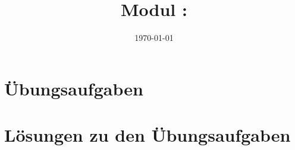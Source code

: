 \documentclass[twoside, a4paper]{article}
\title{Modul \GetItDigitalModulnumber: \GetItDigitalModulname}
\author{}
\institute{GET it digital}
\date{\today}
\begin{document}

{\setlength{\parskip}{0.05ex}    %
	\tableofcontents
	\newpage
}

\printnomenclature
\cleardoublepage

\pagestyle{fancyplain}
\setheadkapitel

\cleardoublepage




\cleardoublepage
\appendix
\setheadanhang

\section{Übungsaufgaben}
\renewcommand{\Aufgabe}[1]{#1}
\renewcommand{\Loesung}[1]{}


\section{Lösungen zu den Übungsaufgaben}
\renewcommand{\Aufgabe}[1]{}
\renewcommand{\Loesung}[1]{#1}


\clearpage
{}
\printindex
\end{document}
